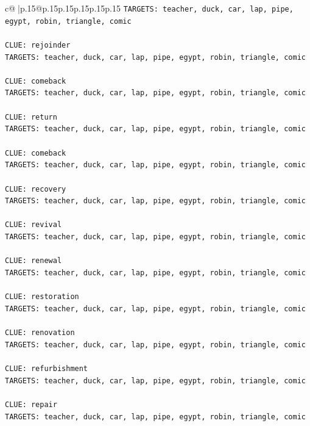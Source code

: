 \documentclass{article}
\begin{document}
{\begin{supertabular}{c@{$\;$}|p{.15\linewidth}@{}p{.15\linewidth}p{.15\linewidth}p{.15\linewidth}p{.15\linewidth}p{.15\linewidth}}
{{{\texttt{TARGETS: teacher, duck, car, lap, pipe, egypt, robin, triangle, comic} \\
\\ 
\texttt{CLUE: rejoinder} \\
\texttt{TARGETS: teacher, duck, car, lap, pipe, egypt, robin, triangle, comic} \\
\\ 
\texttt{CLUE: comeback} \\
\texttt{TARGETS: teacher, duck, car, lap, pipe, egypt, robin, triangle, comic} \\
\\ 
\texttt{CLUE: return} \\
\texttt{TARGETS: teacher, duck, car, lap, pipe, egypt, robin, triangle, comic} \\
\\ 
\texttt{CLUE: comeback} \\
\texttt{TARGETS: teacher, duck, car, lap, pipe, egypt, robin, triangle, comic} \\
\\ 
\texttt{CLUE: recovery} \\
\texttt{TARGETS: teacher, duck, car, lap, pipe, egypt, robin, triangle, comic} \\
\\ 
\texttt{CLUE: revival} \\
\texttt{TARGETS: teacher, duck, car, lap, pipe, egypt, robin, triangle, comic} \\
\\ 
\texttt{CLUE: renewal} \\
\texttt{TARGETS: teacher, duck, car, lap, pipe, egypt, robin, triangle, comic} \\
\\ 
\texttt{CLUE: restoration} \\
\texttt{TARGETS: teacher, duck, car, lap, pipe, egypt, robin, triangle, comic} \\
\\ 
\texttt{CLUE: renovation} \\
\texttt{TARGETS: teacher, duck, car, lap, pipe, egypt, robin, triangle, comic} \\
\\ 
\texttt{CLUE: refurbishment} \\
\texttt{TARGETS: teacher, duck, car, lap, pipe, egypt, robin, triangle, comic} \\
\\ 
\texttt{CLUE: repair} \\
\texttt{TARGETS: teacher, duck, car, lap, pipe, egypt, robin, triangle, comic} \\
}}}
\end{supertabular}}
\end{document}

